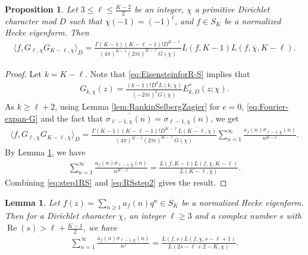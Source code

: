 \documentclass[11pt,letterpaper,reqno]{amsart}
\numberwithin{figure}{section}
\numberwithin{table}{section}
\theoremstyle{definition}
\theoremstyle{plain}
\newtheorem{lemma}[theorem]{Lemma}
\newtheorem{proposition}[theorem]{Proposition}
\theoremstyle{definition}
\theoremstyle{definition}
\theoremstyle{remark}
\numberwithin{equation}{section}
\theoremstyle{remark}
\DeclareMathOperator{\re}{Re}
\begin{document}
\begin{proposition}\label{prop:rankinselbergconvolution}
     Let $3\leq\ell\leq \frac{K-2}{2}$ be an integer, 
     $\chi$ a primitive Dirichlet character mod $D$ such that $\chi(-1)=(-1)^{\ell}$, and $f\in S_K$ be a normalized Hecke eigenform. Then 
     \begin{align}
         \langle f,G_{\ell,\chi}G_{K-\ell,\overline{\chi}}\rangle_{D}=\frac{\Gamma(K-1)(K-\ell-1)!D^{K-\ell}}{(4\pi)^{K-1}(2\pi i)^{K-\ell}\overline{G(\chi)}}L(f,K-1)L(f,\overline{\chi},K-\ell). \nonumber
     \end{align}
\end{proposition}
\begin{proof}
Let $k=K-\ell$. Note that \eqref{eq:EisensteinforR-S} implies that
\begin{align}
    G_{k,\overline{\chi}}(z)=\frac{(k-1)!D^kL(k,\chi)}{(-2\pi i)^{k}G(\chi)}E_{k,D}^{\ast}(z;\chi).
\end{align}
As $k\ge \ell+2$, using Lemma \ref{lem:RankinSelbergZagier} for $e=0$, %
\eqref{eq:Fourier-expan-G} and the fact that $\overline{\sigma_{\ell-1,\chi}(n)}=\sigma_{\ell-1,\overline{\chi}}(n)$, we get
\begin{align}
    \langle f,G_{\ell,\chi}G_{K-\ell,\overline{\chi}}\rangle_{D}=\frac{\Gamma(K-1)(K-\ell-1)!D^{K-\ell}\overline{L(K-\ell,\chi)}}{(4\pi)^{K-1}(2\pi i)^{K-\ell}\overline{G(\chi)}}\sum_{n=1}^{\infty}\frac{a_f(n){\sigma_{\ell-1,\overline{\chi}}(n)}}{n^{K-1}}.\label{eq:step1RS}
\end{align}
By Lemma \ref{lem:easycomp}, we have 
    \begin{align}
\sum_{n=1}^{\infty}\frac{a_f(n)\sigma_{\ell-1,\overline{\chi}}(n)}{n^{K-1}}=\frac{L(f,K-1)L(f,\overline{\chi},K-\ell)}{L(K-\ell,\overline{\chi})}.\label{eq:RSstep2}
    \end{align}
    Combining \eqref{eq:step1RS} and \eqref{eq:RSstep2} gives the result. 
\end{proof}
\begin{lemma}\label{lem:easycomp}
  Let $f(z)=\sum_{n\geq1}a_{f}(n)q^n\in S_K$ be a normalized Hecke eigenform. Then for a Dirichlet character $\chi$, an integer $\ell\geq3$ and a complex number $s$ with $\re(s)>\ell+\frac{K-1}{2}$, we have 
  \begin{align*} 
        \sum_{n=1}^{\infty}\frac{a_f(n)\sigma_{\ell-1,\chi}(n)}{n^{s}}=\frac{L(f,s)L(f,\chi,s-\ell+1)}{L(2s-\ell+2-K,\chi)}.
  \end{align*}
\end{lemma}
\end{document}
